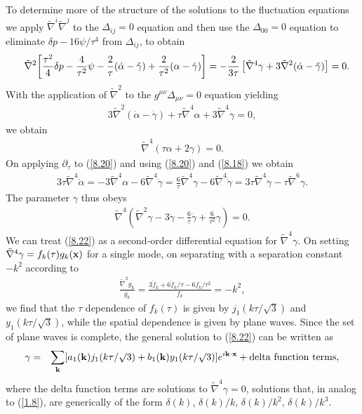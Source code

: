 \documentclass[aps,onecolumn,10pt]{revtex4}
\numberwithin{equation}{section}
\numberwithin{equation}{section}
\begin{document}
To determine more of the structure of the solutions to the fluctuation equations we apply $\tilde{\nabla}^i\tilde{\nabla}^j$ to the $\Delta_{ij}=0$ equation and then use the $\Delta_{00}=0$ equation to eliminate $\delta p -16\psi/\tau^4$ from $\Delta_{ij}$, to obtain
%
\begin{eqnarray}
&&\tilde{\nabla}^2\bigg{[}\frac{\tau^2}{4}\delta p-\frac{4}{\tau^2}\psi-\frac{2}{\tau}(\dot{\alpha}-\ddot{\gamma})+\frac{2}{\tau^2}(\alpha-\dot{\gamma})\bigg{]}
=-\frac{2}{3\tau}\left[
\tilde{\nabla}^4\gamma+3\tilde{\nabla}^2(\dot{\alpha}-\ddot{\gamma})\right]=0.
\label{8.18}
\end{eqnarray}
% 
With the application of $\tilde{\nabla}^2$ to the $g^{\mu\nu}\Delta_{\mu\nu}=0$ equation yielding
%
\begin{eqnarray}
3\tilde{\nabla}^2(\dot{\alpha}-\ddot{\gamma})+\tau \tilde{\nabla}^4\alpha+3\tilde{\nabla}^4\gamma=0,
\label{8.19}
\end{eqnarray}
% 
we obtain
%
\begin{eqnarray}
\tilde{\nabla}^4(\tau \alpha+2\gamma)=0.
\label{8.20}
\end{eqnarray}
% 
On applying $\partial_{\tau}$ to (\ref{8.20}) and using (\ref{8.20}) and (\ref{8.18}) we obtain
%
\begin{eqnarray}
3\tau\tilde{\nabla}^4\dot{\alpha}=-3\tilde{\nabla}^4\alpha-6\tilde{\nabla}^4\dot{\gamma}
=\frac{6}{\tau}\tilde{\nabla}^4\gamma-6\tilde{\nabla}^4\dot{\gamma}
=3\tau\tilde{\nabla}^4\ddot{\gamma}-\tau\tilde{\nabla}^6\gamma.
\label{8.21}
\end{eqnarray}
%
The parameter $\gamma$ thus obeys
%
\begin{eqnarray}
\tilde{\nabla}^4\left(\tilde{\nabla}^2\gamma-3\ddot{\gamma}-\frac{6}{\tau}\dot{\gamma}+\frac{6}{\tau^2}\gamma\right)=0.
\label{8.22}
\end{eqnarray}
%
We can treat (\ref{8.22})  as a second-order differential equation for $\tilde{\nabla}^4\gamma$.
On setting $\tilde{\nabla}^4\gamma=f_k(\tau)g_k({\bf x})$ for a single mode, on separating  with a separation constant $-k^2$ according to
%
\begin{eqnarray}
\frac{\tilde{\nabla}^2g_k}{g_k}=\frac{3\ddot{f}_k+6\dot{f}_k/\tau-6f_k/\tau^2}{f_k}=-k^2,
\label{8.23}
\end{eqnarray}
%
we find that the $\tau$ dependence of $f_k(\tau)$ is given by $j_1(k\tau/\surd{3})$ and $y_1(k\tau/\surd{3})$, while the spatial dependence is given by plane waves. Since the set of plane waves is complete, the general solution to (\ref{8.22}) can be written as
%
\begin{eqnarray}
\gamma&=&\sum_{\bf k}[a_1({\bf k})j_1(k\tau/\surd{3})+b_1({\bf k})y_1(k\tau/\surd{3})]e^{i{\bf k}\cdot{\bf x}} +{\rm delta~function~terms},
\label{8.24}
\end{eqnarray}
%
where the delta function terms are solutions to $\tilde{\nabla}^4\gamma=0$, solutions that, in analog to  (\ref{1.8}),  are generically of the form $\delta(k)$, $\delta(k)/k$, $\delta(k)/k^2$, $\delta(k)/k^3$.
\end{document}
